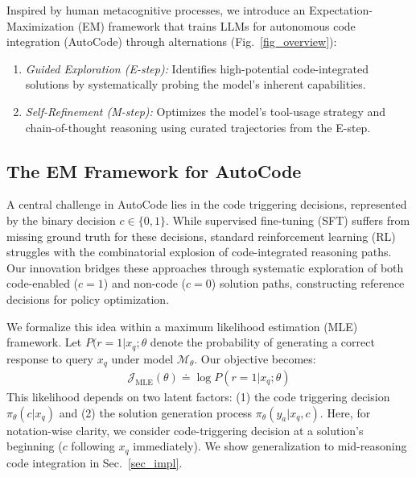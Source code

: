 Inspired by human metacognitive processes, we introduce an Expectation-Maximization (EM) framework that trains LLMs for autonomous code integration (AutoCode) through alternations (Fig.~\ref{fig_overview}):

\begin{enumerate}[leftmargin=0.5cm,topsep=1pt,itemsep=0pt,parsep=0pt]
    \item \emph{Guided Exploration (E-step):} Identifies high-potential code-integrated solutions by systematically probing the model's inherent capabilities.
\item \emph{Self-Refinement (M-step):} Optimizes the model's tool-usage strategy and chain-of-thought reasoning using curated trajectories from the E-step.
\end{enumerate}



\subsection{The EM Framework for AutoCode}

A central challenge in AutoCode lies in the code triggering decisions, represented by the binary decision \(c \in \{0, 1\}\).  While supervised fine-tuning (SFT) suffers from missing ground truth for these decisions, standard reinforcement learning (RL) struggles with the combinatorial explosion of code-integrated reasoning paths. Our innovation bridges these approaches through systematic exploration of both code-enabled (\(c=1\)) and non-code (\(c=0\)) solution paths, constructing reference decisions for policy optimization.

We formalize this idea within a maximum likelihood estimation (MLE) framework. Let \( P (r=1 | x_q;\theta\) denote the probability of generating a correct response to query \( x_q \) under model \(\mathcal{M}_\theta\). Our objective becomes:
\begin{align}
    \mathcal{J}_{\mathrm{MLE}}(\theta) \doteq \log P(r=1 | x_q; \theta) \label{eq_mle}
\end{align}
This likelihood depends on two latent factors: (1) the code triggering decision \(\pi_\theta(c | x_q)\) and (2) the solution generation process \(\pi_\theta(y_a | x_q, c)\). Here, for notation-wise clarity, we consider  code-triggering decision at a solution's beginning (\( c\) following \(x_q\) immediately). We show generalization to mid-reasoning code integration in Sec.~\ref{sec_impl}.

